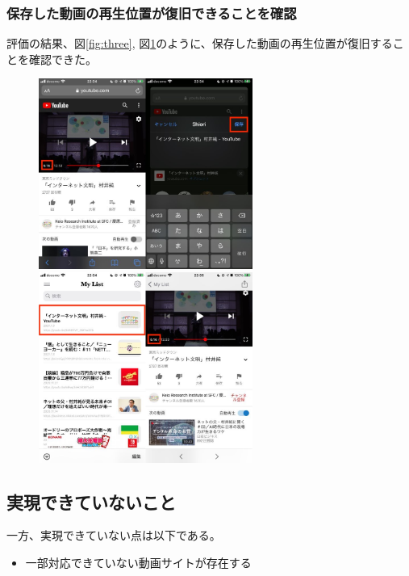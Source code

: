 \documentclass[a4j,10pt]{jsarticle}
\begin{document}
\subsubsection{保存した動画の再生位置が復旧できることを確認}
評価の結果、図\ref{fig:three}, 図\ref{fig:four}のように、保存した動画の再生位置が復旧することを確認できた。
\begin{figure}[htbp]
    \begin{minipage}{0.5\hsize}
        \begin{center}
        \includegraphics[width=70mm]{../assets/playback_position/playback_position1.png}
        \end{center}
        \caption{}
        \label{fig:three}
    \end{minipage}
    \begin{minipage}{0.5\hsize}
        \begin{center}
        \includegraphics[width=70mm]{../assets/playback_position/playback_position2.png}
        \end{center}
        \caption{}
        \label{fig:four}
    \end{minipage}
\end{figure}

\subsection{実現できていないこと}
一方、実現できていない点は以下である。
\begin{itemize}
\item 一部対応できていない動画サイトが存在する
\end{itemize}



\end{document}

